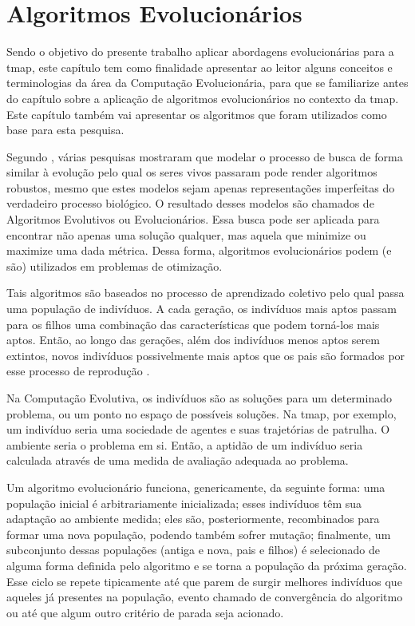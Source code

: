 \chapter{Algoritmos Evolucionários}
\label{alg_evo}

Sendo o objetivo do presente trabalho aplicar abordagens evolucionárias para 
a \ac{tmap}, este capítulo tem como finalidade apresentar ao leitor alguns 
conceitos e terminologias da área da Computação Evolucionária, para que se 
familiarize antes do capítulo sobre a aplicação de algoritmos evolucionários no 
contexto da \ac{tmap}. Este capítulo também vai apresentar os algoritmos que 
foram utilizados como base para esta pesquisa.

Segundo \citep{Back:1993:OEA:1326623.1326625}, várias pesquisas mostraram que 
modelar o processo de busca de forma similar à evolução pelo qual os seres 
vivos passaram pode render algoritmos robustos, mesmo que estes modelos sejam 
apenas representações imperfeitas do verdadeiro processo biológico. O resultado 
desses modelos são chamados de Algoritmos Evolutivos ou Evolucionários. Essa 
busca pode ser aplicada para encontrar não apenas uma solução qualquer, mas 
aquela que minimize ou maximize uma dada métrica. Dessa forma, algoritmos 
evolucionários podem (e são) utilizados em problemas de otimização.

Tais algoritmos são baseados no processo de aprendizado coletivo pelo qual passa 
uma população de indivíduos. A cada geração, os indivíduos mais aptos passam 
para os filhos uma combinação das características que podem torná-los mais aptos. 
Então, ao longo das gerações, além dos indivíduos menos aptos serem extintos, 
novos indivíduos possivelmente mais aptos que os pais são formados por esse 
processo de reprodução \citep{Back:1993:OEA:1326623.1326625}.

Na Computação Evolutiva, os indivíduos são as soluções para um determinado 
problema, ou um ponto no espaço de possíveis soluções. Na \ac{tmap}, por 
exemplo, um indivíduo seria uma sociedade de agentes e suas trajetórias de 
patrulha. O ambiente seria o problema em si. Então, a aptidão de um indivíduo 
seria calculada através de uma medida de avaliação adequada ao problema.

Um algoritmo evolucionário funciona, genericamente, da seguinte forma: uma 
população inicial é arbitrariamente inicializada; esses indivíduos têm sua 
adaptação ao ambiente medida; eles são, posteriormente, recombinados para formar 
uma nova população, podendo também sofrer mutação; finalmente, um subconjunto 
dessas populações (antiga e nova, pais e filhos) é selecionado de alguma forma 
definida pelo algoritmo e se torna a população da próxima geração. Esse ciclo 
se repete tipicamente até que parem de surgir melhores indivíduos que aqueles já 
presentes na população, evento chamado de convergência do algoritmo 
\citep{Back:1993:OEA:1326623.1326625} ou até que algum outro critério de parada 
seja acionado.

